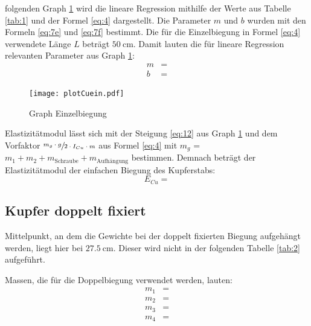 \justifying folgenden Graph \ref{fig:1} wird die lineare Regression mithilfe der Werte aus Tabelle \ref{tab:1} und der Formel \eqref{eq:4} dargestellt.
Die Parameter $m$ und $b$ wurden mit den Formeln \eqref{eq:7e} und \eqref{eq:7f} bestimmt. Die für die Einzelbiegung in Formel \eqref{eq:4} verwendete Länge $L$ beträgt
$\SI{50}{\centi\meter}$. Damit lauten die für lineare Regression relevanten Parameter aus Graph \ref{fig:1}:
\begin{align}
    m &= \text{} \label{eq:12}\\
    b &= \text{} \label{eq:13}
\end{align}

\begin{figure}[H]
    \centering
    \texttt{[image: plotCuein.pdf]}
    \caption{Graph Einzelbiegung}
    \label{fig:1}
\end{figure}

\justifying Elastizitätmodul lässt sich mit der Steigung \eqref{eq:12} aus Graph \ref{fig:1} und dem Vorfaktor 
$\sfrac{m_g \cdot g}{2 \cdot I_{Cu} \cdot m}$ aus Formel \eqref{eq:4} mit $m_g$ = $m_1 + m_2 + m_{\text{Schraube}} + m_{\text{Aufhängung}}$ 
bestimmen. Demnach beträgt der Elastizitätmodul der einfachen Biegung des Kupferstabs:
\begin{equation}
E_{Cu} =  \label{eq:14}
\end{equation}


\subsection{Kupfer doppelt fixiert}\label{sec:4.2}

\justifying Mittelpunkt, an dem die Gewichte bei der doppelt fixierten Biegung aufgehängt werden, liegt hier bei 
$\SI{27.5}{\centi\meter}$. Dieser wird nicht in der folgenden Tabelle \ref{tab:2} aufgeführt.

\justifying Massen, die für die Doppelbiegung verwendet werden, lauten:
\begin{subequations}\label{eq:15}
\begin{align}
    m_1 &= \text{} \label{eq:15a}\\
    m_2 &= \text{} \label{eq:15b}\\
    m_3 &= \text{} \label{eq:15c}\\
    m_4 &= \text{} \label{eq:15d}
\end{align}
\end{subequations}

